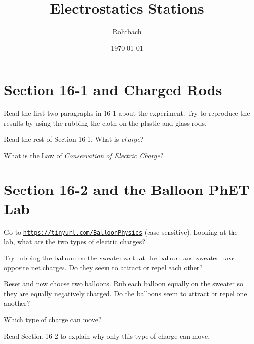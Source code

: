 \documentclass[10pt]{exam}
\title{Electrostatics Stations}
\author{Rohrbach}
\date{\today}
\begin{document}
\maketitle

\section{Section 16-1 and Charged Rods}

\begin{questions}
  \question
    Read the first two paragraphs in 16-1 about the experiment.  Try to reproduce the results by using the rubbing the cloth on the plastic and glass rods. 


  \question
    Read the rest of Section 16-1.  What is \emph{charge}? \vs

  \question
    What is the Law of \emph{Conservation of Electric Charge}? \vs
   
\end{questions}

\section{Section 16-2 and the Balloon PhET Lab}

\begin{questions}
  \question
    Go to \href{https://tinyurl.com/BalloonPhysics}{\texttt{https://tinyurl.com/BalloonPhysics}} (case sensitive). Looking at the lab, what are the two types of electric charges? \vs

  \question
    Try rubbing the balloon on the sweater so that the balloon and sweater have opposite net charges.  Do they seem to attract or repel each other? \vs

  \question
    Reset and now choose two balloons.  Rub each balloon equally on the sweater so they are equally negatively charged.  Do the balloons seem to attract or repel one another? \vs

  \question
    Which type of charge can move? \vs

  \question
    Read Section 16-2 to explain why only this type of charge can move. \vs

\end{questions}
\end{document}
